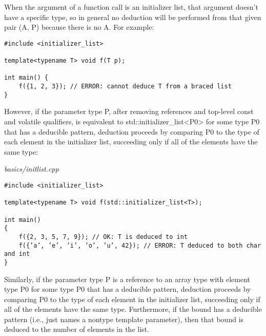 When the argument of a function call is an initializer list, that argument doesn’t have a specific type, so in general no deduction will be performed from that given pair (A, P) because there is no A. For example:

\begin{lstlisting}[style=styleCXX]
#include <initializer_list>

template<typename T> void f(T p);

int main() {
	f({1, 2, 3}); // ERROR: cannot deduce T from a braced list
}
\end{lstlisting}

However, if the parameter type P, after removing references and top-level const and volatile qualifiers, is equivalent to std::initializer\_list<P0> for some type P0 that has a deducible pattern, deduction proceeds by comparing P0 to the type of each element in the initializer list, succeeding only if all of the elements have the same type:

\noindent
\textit{basics/initlist.cpp}
\begin{lstlisting}[style=styleCXX]
#include <initializer_list>

template<typename T> void f(std::initializer_list<T>);

int main()
{
	f({2, 3, 5, 7, 9}); // OK: T is deduced to int
	f({’a’, ’e’, ’i’, ’o’, ’u’, 42}); // ERROR: T deduced to both char and int
}
\end{lstlisting}

Similarly, if the parameter type P is a reference to an array type with element type P0 for some type P0 that has a deducible pattern, deduction proceeds by comparing P0 to the type of each element in the initializer list, succeeding only if all of the elements have the same type. Furthermore, if the bound has a deducible pattern (i.e., just names a nontype template parameter), then that bound is deduced to the number of elements in the list.













































